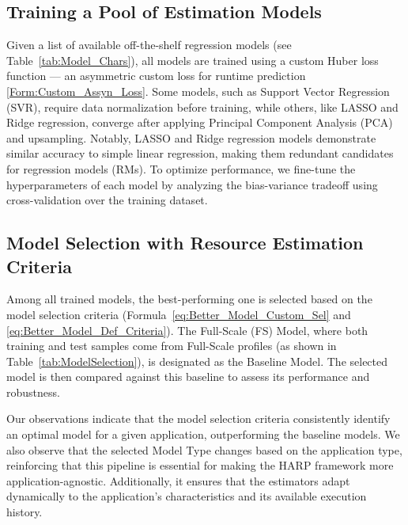 \subsection{Training a Pool of Estimation Models}

Given a list of available off-the-shelf regression models (see Table~\ref{tab:Model_Chars}), all models are trained using a custom Huber loss function — an asymmetric custom loss for runtime prediction \ref{Form:Custom_Assyn_Loss}. Some models, such as Support Vector Regression (SVR), require data normalization before training, while others, like LASSO and Ridge regression, converge after applying Principal Component Analysis (PCA) and upsampling. Notably, LASSO and Ridge regression models demonstrate similar accuracy to simple linear regression, making them redundant candidates for regression models (RMs). To optimize performance, we fine-tune the hyperparameters of each model by analyzing the bias-variance tradeoff using cross-validation over the training dataset.

\subsection{Model Selection with Resource Estimation Criteria}

Among all trained models, the best-performing one is selected based on the model selection criteria (Formula~\ref{eq:Better_Model_Custom_Sel} and \ref{eq:Better_Model_Def_Criteria}). The Full-Scale (FS) Model, where both training and test samples come from Full-Scale profiles (as shown in Table~\ref{tab:ModelSelection}), is designated as the Baseline Model. The selected model is then compared against this baseline to assess its performance and robustness.

Our observations indicate that the model selection criteria consistently identify an optimal model for a given application, outperforming the baseline models. We also observe that the selected Model Type changes based on the application type, reinforcing that this pipeline is essential for making the HARP framework more application-agnostic. Additionally, it ensures that the estimators adapt dynamically to the application's characteristics and its available execution history.

